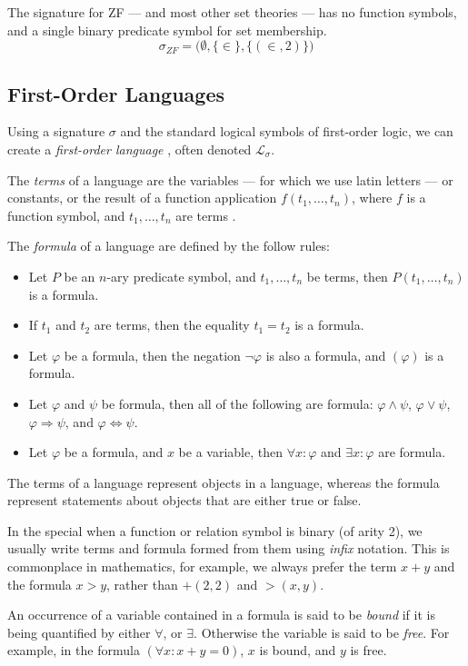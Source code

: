\documentclass[11pt]{report}
\theoremstyle{definition}
\theoremstyle{theorem}
\theoremstyle{lemma}
\begin{document}
The signature for ZF --- and most other set theories --- has no function symbols, and a single binary predicate symbol for set membership.
$$\sigma_{\mathit{ZF}} = \big(\emptyset,\{\in\},\{(\in, 2)\})$$

\subsection{First-Order Languages}
Using a signature $\sigma$ and the standard logical symbols of first-order logic, we can create a \emph{first-order language} \cite[ch.~1]{stanmodel}, often denoted $\mathcal{L}_\sigma$.

The \emph{terms} of a language are the variables --- for which we use latin letters --- or constants, or the result of a function application $f(t_1,\ldots, t_n)$, where $f$ is a function symbol, and $t_1,\ldots,t_n$ are terms \cite[ch.~1.3]{selinger}.

The \emph{formula} of a language are defined \cite[ch~1.4]{selinger} by the follow rules:
\begin{itemize}
  \item Let $P$ be an $n$-ary predicate symbol, and $t_1,\ldots,t_n$ be terms, then $P(t_1,\ldots,t_n)$ is a formula.
  \item If $t_1$ and $t_2$ are terms, then the equality $t_1 = t_2$ is a formula.
  \item Let $\varphi$ be a formula, then the negation $\neg\varphi$ is also a formula, and $(\varphi)$ is a formula.
  \item Let $\varphi$ and $\psi$ be formula, then all of the following are formula: $\varphi\wedge\psi$, $\varphi\vee\psi$, $\varphi\Rightarrow\psi$, and $\varphi\Leftrightarrow\psi$.
  \item Let $\varphi$ be a formula, and $x$ be a variable, then $\forall x:\varphi$ and $\exists x:\varphi$ are formula.
\end{itemize}
The terms of a language represent objects in a language, whereas the formula represent statements about objects that are either true or false. 

In the special when a function or relation symbol is binary (of arity 2), we usually write terms and formula formed from them using \emph{infix} notation.
This is commonplace in mathematics, for example, we always prefer the term $x+y$ and the formula $x>y$, rather than $+(2,2)$ and $>(x,y)$.

An occurrence of a variable contained in a formula is said to be \emph{bound} if it is being quantified by either $\forall$, or $\exists$.
Otherwise the variable is said to be \emph{free}. For example, in the formula $(\forall x: x+y=0)$, $x$ is bound, and $y$ is free.
\end{document}
